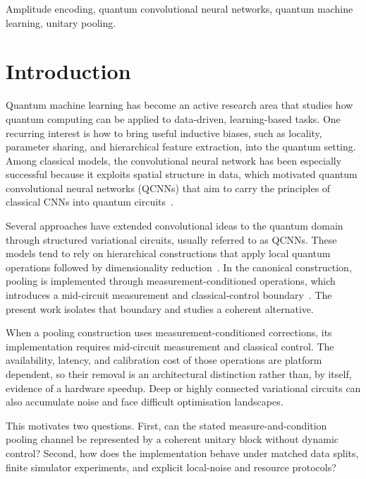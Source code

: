\documentclass[conference]{IEEEtran}
\begin{document}
\begin{IEEEkeywords}
Amplitude encoding, quantum convolutional neural networks, quantum machine
learning, unitary pooling.
\end{IEEEkeywords}

\section{Introduction}
Quantum machine learning has become an active research area that studies how quantum computing can be applied to data-driven, learning-based tasks. One recurring interest is how to bring useful inductive biases, such as locality, parameter sharing, and hierarchical feature extraction, into the quantum setting. Among classical models, the convolutional neural network has been especially successful because it exploits spatial structure in data, which motivated quantum convolutional neural networks (QCNNs) that aim to carry the principles of classical CNNs into quantum circuits~\cite{ref37}.

Several approaches have extended convolutional ideas to the quantum domain through structured variational circuits, usually referred to as QCNNs. These models tend to rely on hierarchical constructions that apply local quantum operations followed by dimensionality reduction~\cite{ref37,ref46}. In the canonical construction, pooling is implemented through measurement-conditioned operations, which introduces a mid-circuit measurement and classical-control boundary~\cite{ref37}. The present work isolates that boundary and studies a coherent alternative.

When a pooling construction uses measurement-conditioned corrections, its implementation requires mid-circuit measurement and classical control. The availability, latency, and calibration cost of those operations are platform dependent, so their removal is an architectural distinction rather than, by itself, evidence of a hardware speedup. Deep or highly connected variational circuits can also accumulate noise and face difficult optimisation landscapes.

This motivates two questions. First, can the stated measure-and-condition pooling channel be represented by a coherent unitary block without dynamic control? Second, how does the implementation behave under matched data splits, finite simulator experiments, and explicit local-noise and resource protocols? 
\end{document}
